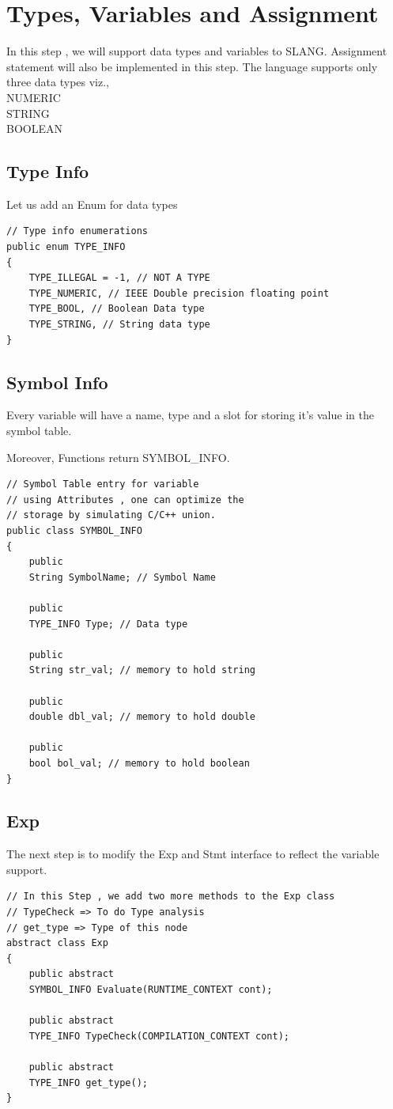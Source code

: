 \chapter{Types, Variables and Assignment}
In this step , we will support data types and variables to SLANG. Assignment statement will also be implemented in this step.
The language supports only three data types viz.,\\
NUMERIC\\
STRING\\
BOOLEAN\\
\section{Type Info}
Let us add an Enum for data types
\lstset{style=csharp}
\begin{lstlisting}
// Type info enumerations
public enum TYPE_INFO
{
	TYPE_ILLEGAL = -1, // NOT A TYPE
	TYPE_NUMERIC, // IEEE Double precision floating point
	TYPE_BOOL, // Boolean Data type
	TYPE_STRING, // String data type
}
\end{lstlisting}

\section{Symbol Info}
Every variable will have a name, type and a slot for storing it's value in the symbol table.

Moreover, Functions return SYMBOL\_INFO.
\lstset{style=csharp}
\begin{lstlisting}
// Symbol Table entry for variable
// using Attributes , one can optimize the
// storage by simulating C/C++ union.
public class SYMBOL_INFO
{
	public 
	String SymbolName; // Symbol Name
	
	public 
	TYPE_INFO Type; // Data type
	
	public 
	String str_val; // memory to hold string
	
	public 
	double dbl_val; // memory to hold double
	
	public 
	bool bol_val; // memory to hold boolean
}
\end{lstlisting}

\section{Exp}
The next step is to modify the Exp and Stmt interface to reflect the variable support.
\lstset{style=csharp}
\begin{lstlisting}
// In this Step , we add two more methods to the Exp class
// TypeCheck => To do Type analysis
// get_type => Type of this node
abstract class Exp
{
	public abstract 
	SYMBOL_INFO Evaluate(RUNTIME_CONTEXT cont);
	
	public abstract 
	TYPE_INFO TypeCheck(COMPILATION_CONTEXT cont);
	
	public abstract 
	TYPE_INFO get_type();
}
\end{lstlisting}

